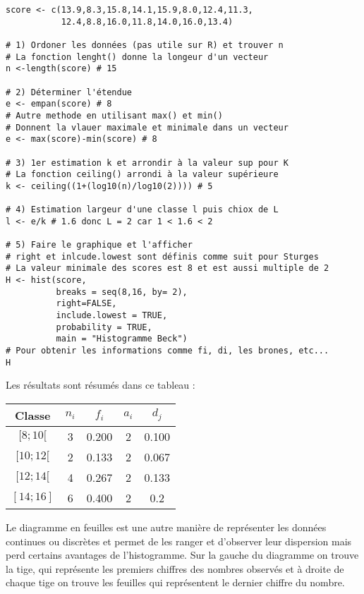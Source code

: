 \documentclass{report}
\begin{document}
\begin{verbatim}
score <- c(13.9,8.3,15.8,14.1,15.9,8.0,12.4,11.3, 
           12.4,8.8,16.0,11.8,14.0,16.0,13.4)

# 1) Ordoner les données (pas utile sur R) et trouver n
# La fonction lenght() donne la longeur d'un vecteur
n <-length(score) # 15

# 2) Déterminer l'étendue 
e <- empan(score) # 8
# Autre methode en utilisant max() et min() 
# Donnent la vlauer maximale et minimale dans un vecteur
e <- max(score)-min(score) # 8

# 3) 1er estimation k et arrondir à la valeur sup pour K
# La fonction ceiling() arrondi à la valeur supérieure 
k <- ceiling((1+(log10(n)/log10(2)))) # 5

# 4) Estimation largeur d'une classe l puis chiox de L
l <- e/k # 1.6 donc L = 2 car 1 < 1.6 < 2

# 5) Faire le graphique et l'afficher
# right et inlcude.lowest sont définis comme suit pour Sturges
# La valeur minimale des scores est 8 et est aussi multiple de 2
H <- hist(score,
          breaks = seq(8,16, by= 2),
          right=FALSE,
          include.lowest = TRUE,
          probability = TRUE,
          main = "Histogramme Beck")
# Pour obtenir les informations comme fi, di, les brones, etc...
H
\end{verbatim}
Les résultats sont résumés dans ce tableau :

\quad
\begin{center}
\begin{tabular}{ c c c c c }
\hline
Classe & $n_i$&$f_i$&$a_i$&$d_j$ \\
\hline
$[8;10[$ & 3 & 0.200 & 2 & 0.100 \\
$[10;12[$ & 2 & 0.133 & 2 & 0.067 \\
$[12;14[$ & 4 & 0.267 & 2 & 0.133  \\
$[14;16]$ & 6 & 0.400 & 2 & 0.2  \\
\hline
\end{tabular}
\end{center}
\quad

Le diagramme en feuilles est une autre manière de représenter les données continues ou discrètes et permet de les ranger et d'observer leur dispersion mais perd certains avantages de l'histogramme. Sur la gauche du diagramme on trouve la tige, qui représente les premiers chiffres des nombres observés et à droite de chaque tige on trouve les feuilles qui représentent le dernier chiffre du nombre.
\end{document}
